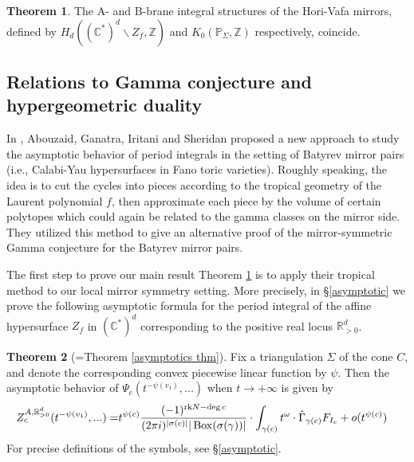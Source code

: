 \documentclass[11pt,reqno]{amsart}
\def\rk {{\operatorname{rk}}}
\def\CC {{\mathbb C}}
\def\R {{\mathbb R}}
\def\Z {{\mathbb Z}}
\def\PP {{\mathbb P}}
\theoremstyle{definition}
\newtheorem{theorem}{Theorem}[section]
\numberwithin{equation}{section}
\begin{document}
\smallskip

\begin{theorem}\label{main theorem}
	The A- and B-brane integral structures of the Hori-Vafa mirrors, defined by $H_{d}\left((\CC^*)^{d}\backslash Z_f,\Z\right)$ and 
$K_0(\PP_{\Sigma},\Z)$ respectively, coincide.
\end{theorem}





\subsection{Relations to Gamma conjecture and hypergeometric duality}

In \cite{AGIS}, Abouzaid, Ganatra, Iritani and Sheridan proposed a new approach to study the asymptotic behavior of period integrals in the setting of Batyrev mirror pairs (i.e., Calabi-Yau hypersurfaces in Fano toric varieties). Roughly speaking, the idea is to cut the cycles into pieces according to the tropical geometry of the Laurent polynomial $f$, then approximate each piece by the volume of certain polytopes which could again be related to the gamma classes on the mirror side. They utilized this method to give an alternative proof of the mirror-symmetric Gamma conjecture for the Batyrev mirror pairs.

\smallskip

The first step to prove our main result Theorem \ref{main theorem} is to apply their tropical method to our local mirror symmetry setting. More precisely, in \S\ref{asymptotic} we prove the following asymptotic formula for the period integral of the affine hypersurface $Z_f$ in $(\CC^*)^d$ corresponding to the positive real locus $\R_{>0}^d$.

\smallskip

\begin{theorem}[=Theorem \ref{asymptotics thm}]
	Fix a triangulation $\Sigma$ of the cone $C$, and denote the corresponding convex piecewise linear function by $\psi$. Then the asymptotic behavior of $\Psi_c(t^{-\psi(v_1)},...)$ when $t\rightarrow +\infty$ is given by
	\begin{align*}
		Z^{A,\R_{>0}^d}_c(t^{-\psi(v_1)},...)=&t^{\psi(c)}\frac{(-1)^{\rk N-\deg c}}{(2\pi{\rm i})^{|\sigma(c)|}|\operatorname{Box}(\sigma(\gamma))|}\cdot\int_{\gamma(c)} t^{\omega}\cdot \hat{\Gamma}_{\gamma(c)} F_{I_c}+o(t^{\psi(c)})
	\end{align*}
	For precise definitions of the symbols, see \S\ref{asymptotic}.
\end{theorem}
\end{document}
